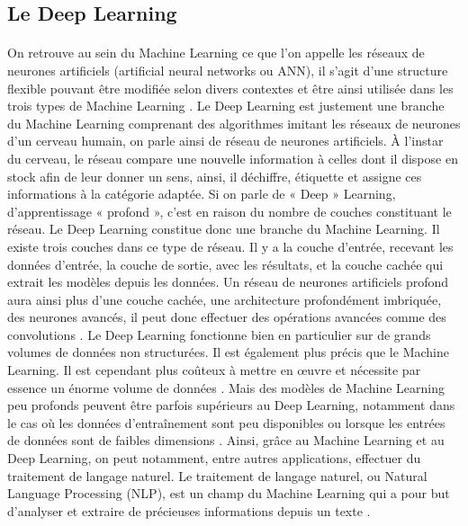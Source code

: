 \documentclass{article}
\begin{document}
\subsection{Le Deep Learning}
\paragraph{}
On retrouve au sein du Machine Learning ce que l’on appelle les réseaux de neurones artificiels (artificial neural networks ou ANN), il s’agit d’une structure flexible pouvant être modifiée selon divers contextes et être ainsi utilisée dans les trois types de Machine Learning \cite{janiesch2021machine}. 
Le Deep Learning est justement une branche du Machine Learning comprenant des algorithmes imitant les réseaux de neurones d’un cerveau humain, on parle ainsi de réseau de neurones artificiels. À l’instar du cerveau, le réseau compare une nouvelle information à celles dont il dispose en stock afin de leur donner un sens, ainsi, il déchiffre, étiquette et assigne ces informations à la catégorie adaptée. Si on parle de « Deep » Learning, d’apprentissage « profond », c’est en raison du nombre de couches constituant le réseau. Le Deep Learning constitue donc une branche du Machine Learning. Il existe trois couches dans ce type de réseau. Il y a la couche d’entrée, recevant les données d’entrée, la couche de sortie, avec les résultats, et la couche cachée qui extrait les modèles depuis les données. Un réseau de neurones artificiels profond aura ainsi plus d’une couche cachée, une architecture profondément imbriquée, des neurones avancés, il peut donc effectuer des opérations avancées comme des convolutions \cite{janiesch2021machine}. Le Deep Learning fonctionne bien en particulier sur de grands volumes de données non structurées. Il est également plus précis que le Machine Learning. Il est cependant plus coûteux à mettre en œuvre et nécessite par essence un énorme volume de données \cite{jakhar2020artificial}. Mais des modèles de Machine Learning peu profonds peuvent être parfois supérieurs au Deep Learning, notamment dans le cas où les données d’entraînement sont peu disponibles ou lorsque les entrées de données sont de faibles dimensions \cite{janiesch2021machine}. 
Ainsi, grâce au Machine Learning et au Deep Learning, on peut notamment, entre autres applications, effectuer du traitement de langage naturel. Le traitement de langage naturel, ou Natural Language Processing (NLP), est un champ du Machine Learning qui a pour but d’analyser et extraire de précieuses informations depuis un texte \cite{di2021latin}. 
\end{document}
